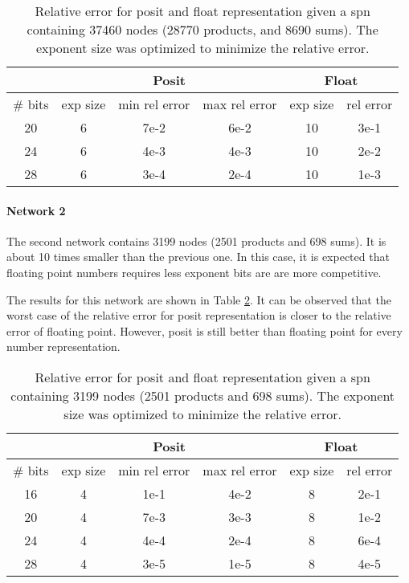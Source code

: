 \begin{table}[!ht]
	\centering
	\caption{Relative error for posit and float representation given a \gls{spn} containing 37460 nodes (28770 products, and 8690 sums). The exponent size was optimized to minimize the relative error. }
	\label{tab:net1_res}
	\begin{tabular}{|c||c|c|c||c|c|}
	\hline
		& \multicolumn{3}{c||}{Posit} &  \multicolumn{2}{c|}{Float} \\
	\hline
		\# bits & exp size & min rel error & max rel error & exp size & rel error \\
	\hline
		20 & 6 & 7e-2 & 6e-2 & 10 & 3e-1 \\
		24 & 6 & 4e-3 & 4e-3 & 10 & 2e-2 \\
		28 & 6 & 3e-4 & 2e-4 & 10 & 1e-3 \\
	\hline
	\end{tabular}
\end{table}


\paragraph{Network 2}

The second network contains 3199 nodes (2501 products and 698 sums). It is about 10 times smaller than the previous one. In this case, it is expected that floating point numbers requires less exponent bits are are more competitive.

The results for this network are shown in Table \ref{tab:net2_res}. It can be observed that the worst case of the relative error for posit representation is closer to the relative error of floating point. However, posit is still better than floating point for every number representation.

\begin{table}[!ht]
	\centering
	\caption{Relative error for posit and float representation given a \gls{spn} containing 3199 nodes (2501 products and 698 sums). The exponent size was optimized to minimize the relative error.}
	\label{tab:net2_res}
	\begin{tabular}{|c||c|c|c||c|c|}
	\hline
		& \multicolumn{3}{c||}{Posit} &  \multicolumn{2}{c|}{Float} \\
	\hline
		\# bits & exp size & min rel error & max rel error & exp size & rel error \\
	\hline
		16 & 4 & 1e-1 & 4e-2 & 8 & 2e-1 \\
		20 & 4 & 7e-3 & 3e-3 & 8 & 1e-2 \\
		24 & 4 & 4e-4 & 2e-4 & 8 & 6e-4 \\
		28 & 4 & 3e-5 & 1e-5 & 8 & 4e-5 \\
	\hline
	\end{tabular}
\end{table}


